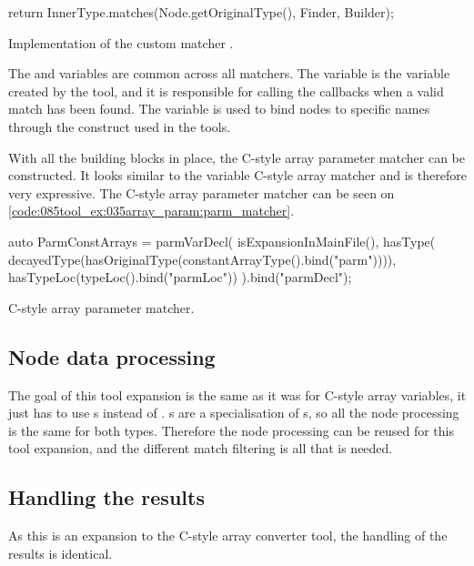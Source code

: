 \begin{listing}[H]
    \begin{cppcode}
return InnerType.matches(Node.getOriginalType(), Finder, Builder);
    \end{cppcode}
    \caption{Implementation of the custom matcher .}
    \label{code:085tool_ex:035array_param:match_impl}
\end{listing}

The  and  variables are common across all matchers. The  variable is the  variable created by the tool, and it is responsible for calling the callbacks when a valid match has been found. The  variable is used to bind nodes to specific names through the  construct used in the tools.

With all the building blocks in place, the C-style array parameter matcher can be constructed. It looks similar to the variable C-style array matcher and is therefore very expressive. The C-style array parameter matcher can be seen on \cref{code:085tool_ex:035array_param:parm_matcher}.

\begin{listing}[H]
    \begin{cppcode}
auto ParmConstArrays = parmVarDecl(
        isExpansionInMainFile(),
        hasType(
            decayedType(hasOriginalType(constantArrayType().bind("parm")))),
        hasTypeLoc(typeLoc().bind("parmLoc")) 
    ).bind("parmDecl");
    \end{cppcode}
    \caption{C-style array parameter matcher.}
    \label{code:085tool_ex:035array_param:parm_matcher}
\end{listing}

\subsection{Node data processing}

The goal of this tool expansion is the same as it was for C-style array variables, it just has to use s instead of . s are a specialisation of s, so all the node processing is the same for both types. Therefore the node processing can be reused for this tool expansion, and the different match filtering is all that is needed.

\subsection{Handling the results}

As this is an expansion to the C-style array converter tool, the handling of the results is identical.